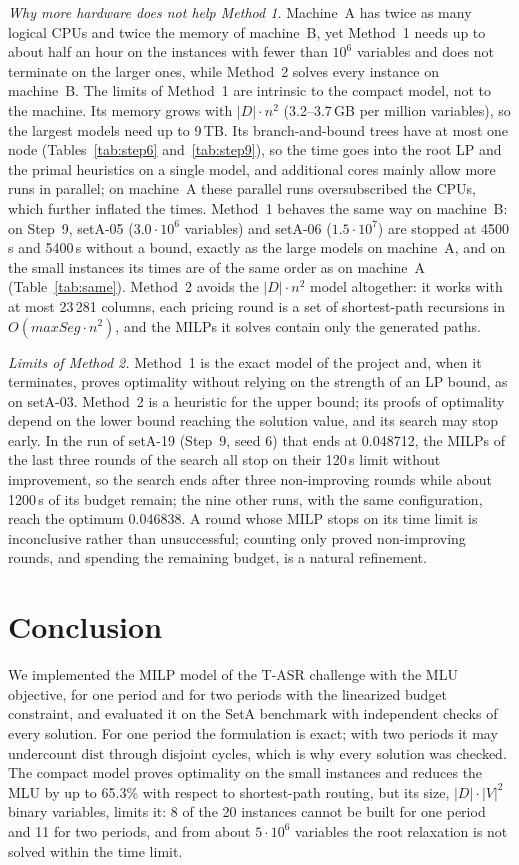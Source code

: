 \documentclass[conference]{IEEEtran}
\begin{document}
\emph{Why more hardware does not help Method 1.} Machine~A has twice as many logical CPUs and twice the memory of machine~B, yet Method~1 needs up to about half an hour on the instances with fewer than $10^6$ variables and does not terminate on the larger ones, while Method~2 solves every instance on machine~B. The limits of Method~1 are intrinsic to the compact model, not to the machine. Its memory grows with $|D|\cdot n^2$ (3.2--3.7\,GB per million variables), so the largest models need up to 9\,TB. Its branch-and-bound trees have at most one node (Tables~\ref{tab:step6} and~\ref{tab:step9}), so the time goes into the root LP and the primal heuristics on a single model, and additional cores mainly allow more runs in parallel; on machine~A these parallel runs oversubscribed the CPUs, which further inflated the times. Method~1 behaves the same way on machine~B: on Step~9, setA-05 ($3.0\cdot10^6$ variables) and setA-06 ($1.5\cdot10^7$) are stopped at 4500\,s and 5400\,s without a bound, exactly as the large models on machine~A, and on the small instances its times are of the same order as on machine~A (Table~\ref{tab:same}). Method~2 avoids the $|D|\cdot n^2$ model altogether: it works with at most 23\,281 columns, each pricing round is a set of shortest-path recursions in $O(maxSeg\cdot n^2)$, and the MILPs it solves contain only the generated paths.

\emph{Limits of Method 2.} Method~1 is the exact model of the project and, when it terminates, proves optimality without relying on the strength of an LP bound, as on setA-03. Method~2 is a heuristic for the upper bound; its proofs of optimality depend on the lower bound reaching the solution value, and its search may stop early. In the run of setA-19 (Step~9, seed 6) that ends at 0.048712, the MILPs of the last three rounds of the search all stop on their 120\,s limit without improvement, so the search ends after three non-improving rounds while about 1200\,s of its budget remain; the nine other runs, with the same configuration, reach the optimum 0.046838. A round whose MILP stops on its time limit is inconclusive rather than unsuccessful; counting only proved non-improving rounds, and spending the remaining budget, is a natural refinement.

\section{Conclusion}\label{sec:concl}

We implemented the MILP model of the T-ASR challenge with the MLU objective, for one period and for two periods with the linearized budget constraint, and evaluated it on the SetA benchmark with independent checks of every solution. For one period the formulation is exact; with two periods it may undercount $\mathrm{dist}$ through disjoint cycles, which is why every solution was checked. The compact model proves optimality on the small instances and reduces the MLU by up to 65.3\% with respect to shortest-path routing, but its size, $|D|\cdot|V|^2$ binary variables, limits it: 8 of the 20 instances cannot be built for one period and 11 for two periods, and from about $5\cdot10^6$ variables the root relaxation is not solved within the time limit.
\end{document}
